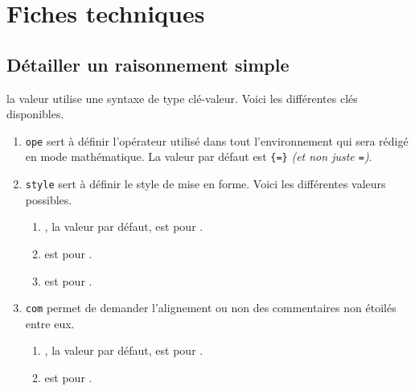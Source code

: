 \documentclass[12pt,a4paper]{article}
\begin{document}

\section{Fiches techniques}

\subsection{Détailler un raisonnement simple} 


\IDoption{} la valeur utilise une syntaxe de type clé-valeur. Voici les différentes clés disponibles.

\begin{enumerate}
	\item \verb+ope+ sert à définir l'opérateur utilisé dans tout l'environnement qui sera rédigé en mode mathématique. 
	      La valeur par défaut est \verb+{=}+ \emph{(et non juste \texttt{=})}.

	\item \verb+style+ sert à définir le style de mise en forme. Voici les différentes valeurs possibles.
	      \begin{enumerate}
	      		\item {}, la valeur par défaut, est pour .

	      		\item {} est pour .

	      		\item {} est pour  .
	      \end{enumerate}

	\item \verb+com+ permet de demander l'alignement ou non des commentaires non étoilés entre eux.
	      \begin{enumerate}
	      		\item {}, la valeur par défaut, est pour  .

	      		\item {} est pour .

	      \end{enumerate}
\end{enumerate}
\end{document}
